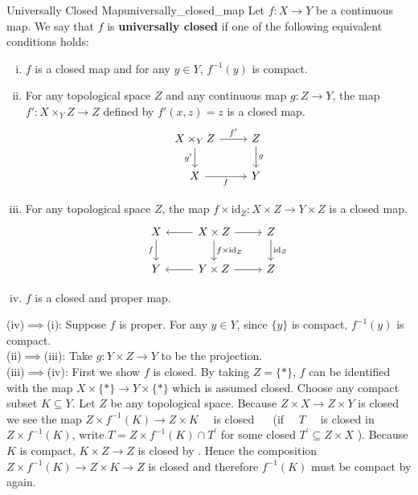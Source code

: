 \documentclass{report}
\begin{document}
\begin{definition}{Universally Closed Map}{universally_closed_map}
	Let $f : X \rightarrow Y$ be a continuous map. We say that $f$ is \textbf{universally closed} if one of the following equivalent conditions holds:
	\begin{enumerate}[(i)]
		\item $f$ is a closed map and for any $y\in Y$, $f^{-1}(y)$ is compact.
		\item For any topological space $Z$ and any continuous map $g : Z \rightarrow Y$, the map $f' : X \times_Y Z \rightarrow Z$ defined by $f'(x, z) = z$ is a closed map.
		\[
			\begin{tikzcd}
				X\times_Y Z \arrow[r, "f'"] \arrow[d, "g'"'] & Z \arrow[d, "g"] \\
				X \arrow[r, "f"']                            & Y               
			\end{tikzcd}
		\]     
		\item For any topological space $Z$, the map $f \times \mathrm{id}_Z : X \times Z \rightarrow Y \times Z$ is a closed map.
		\[
			\begin{tikzcd}
				X \arrow[d, "f"'] & X\times Z \arrow[r] \arrow[l] \arrow[d, "f\times\mathrm{id}_Z"] & Z \arrow[d, "\mathrm{id}_Z"] \\
				Y                 & Y\times Z \arrow[r] \arrow[l]                                   & Z                           
				\end{tikzcd}
		\]
		\item $f$ is a closed and proper map.
	\end{enumerate}
\end{definition}
\begin{prf}
	(iv)$\implies$(i): Suppose $f$ is proper. For any $y\in Y$, since $\{y\}$ is compact, $f^{-1}(y)$ is compact.\\

	(ii)$\implies$(iii): Take $g:Y\times Z\to Y$ to be the projection.\\

	(iii)$\implies$(iv): First we show $f$ is closed. By taking $Z=\{*\}$, $f$ can be identified with the map $ X \times\{*\}\rightarrow Y\times \{*\}$ which is assumed closed. Choose any compact subset $K \subseteq Y$. Let $Z$ be any topological space. Because $Z \times X \rightarrow Z \times Y$ is closed we see the map $Z \times f^{-1}(K) \rightarrow Z \times K \quad$ is closed $\quad$ (if $\quad T \quad$ is closed in $Z \times f^{-1}(K)$, write $T=Z \times f^{-1}(K) \cap T^{\prime}$ for some closed $T^{\prime} \subseteq Z \times X$ ). Because $K$ is compact, $K \times Z \rightarrow Z$ is closed by . Hence the composition $Z \times f^{-1}(K) \rightarrow Z \times K \rightarrow Z$ is closed and therefore $f^{-1}(K)$ must be compact by  again.
\end{prf}
\end{document}
